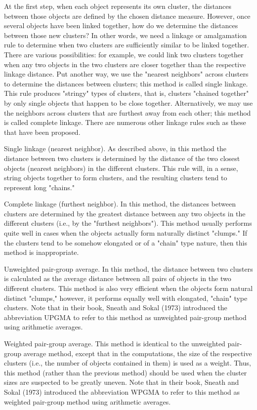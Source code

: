 At the first step, when each object represents its own cluster, the distances between those objects are defined by the chosen distance measure. However, once several objects have been linked together, how do we determine the distances between those new clusters? In other words, we need a linkage or amalgamation rule to determine when two clusters are sufficiently similar to be linked together. There are various possibilities: for example, we could link two clusters together when any two objects in the two clusters are closer together than the respective linkage distance. Put another way, we use the "nearest neighbors" across clusters to determine the distances between clusters; this method is called single linkage. This rule produces "stringy" types of clusters, that is, clusters "chained together" by only single objects that happen to be close together. Alternatively, we may use the neighbors across clusters that are furthest away from each other; this method is called complete linkage. There are numerous other linkage rules such as these that have been proposed.

Single linkage (nearest neighbor). As described above, in this method the distance between two clusters is determined by the distance of the two closest objects (nearest neighbors) in the different clusters. This rule will, in a sense, string objects together to form clusters, and the resulting clusters tend to represent long "chains."

Complete linkage (furthest neighbor). In this method, the distances between clusters are determined by the greatest distance between any two objects in the different clusters (i.e., by the "furthest neighbors"). This method usually performs quite well in cases when the objects actually form naturally distinct "clumps." If the clusters tend to be somehow elongated or of a "chain" type nature, then this method is inappropriate.

Unweighted pair-group average. In this method, the distance between two clusters is calculated as the average distance between all pairs of objects in the two different clusters. This method is also very efficient when the objects form natural distinct "clumps," however, it performs equally well with elongated, "chain" type clusters. Note that in their book, Sneath and Sokal (1973) introduced the abbreviation UPGMA to refer to this method as unweighted pair-group method using arithmetic averages.

Weighted pair-group average. This method is identical to the unweighted pair-group average method, except that in the computations, the size of the respective clusters (i.e., the number of objects contained in them) is used as a weight. Thus, this method (rather than the previous method) should be used when the cluster sizes are suspected to be greatly uneven. Note that in their book, Sneath and Sokal (1973) introduced the abbreviation WPGMA to refer to this method as weighted pair-group method using arithmetic averages.

